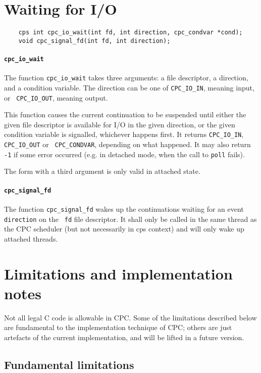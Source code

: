 \documentclass[a4paper]{report}
\begin{document}
\section{Waiting for I/O}

\begin{verbatim}
    cps int cpc_io_wait(int fd, int direction, cpc_condvar *cond);
    void cpc_signal_fd(int fd, int direction);
\end{verbatim}

\paragraph{\tt cpc\_io\_wait} The function {\tt cpc\_io\_wait} takes three
arguments: a file descriptor, a direction, and a condition variable.
The direction can be one of {\tt CPC\_IO\_IN}, meaning input, or {\tt
  CPC\_IO\_OUT}, meaning output.

This function causes the current continuation to be suspended until
either the given file descriptor is available for I/O in the given
direction, or the given condition variable is signalled, whichever
happens first.  It returns {\tt CPC\_IO\_IN}, {\tt CPC\_IO\_OUT} or {\tt
CPC\_CONDVAR}, depending on what happened.  It may also return {\tt -1}
if some error occurred (e.g. in detached mode, when the call to
{\tt poll} fails).

The form with a third argument is only valid in attached state.

\paragraph{\tt cpc\_signal\_fd} The function {\tt cpc\_signal\_fd} wakes
up the continuations waiting for an event {\tt direction} on the {\tt
fd} file descriptor.  It shall only be called in the same thread as the
CPC scheduler (but not necessarily in cps context) and will only wake up
attached threads.

\section{Limitations and implementation notes}

Not all legal C code is allowable in CPC.  Some of the limitations
described below are fundamental to the implementation technique of
CPC; others are just artefacts of the current implementation, and will
be lifted in a future version.

\subsection{Fundamental limitations}
\end{document}
